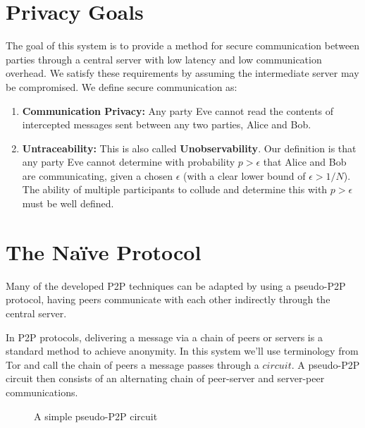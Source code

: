 \documentclass[twocolumn,11pt,english]{article}
\begin{document}
\section{Privacy Goals}
The goal of this system is to provide a method for secure communication between parties through a central server with low latency and low communication overhead. We satisfy these requirements by assuming the intermediate server may be compromised. We define secure communication as:
\begin{enumerate}
\item\textbf{Communication Privacy:} Any party Eve cannot read the contents of intercepted messages sent between any two parties, Alice and Bob. 
\item\textbf{Untraceability:} This is also called \textbf{Unobservability}. Our definition is that any party Eve cannot determine with probability $p > \epsilon$ that Alice and Bob are communicating, given a chosen $\epsilon$ (with a clear lower bound of $\epsilon > 1/N$). The ability of multiple participants to collude and determine this with $p > \epsilon$ must be well defined.
\end{enumerate}
\section{The Na\"ive Protocol}
\label{sec:naive}
Many of the developed P2P techniques can be adapted by using a pseudo-P2P protocol, having peers communicate with each other indirectly through the central server. 

In P2P protocols, delivering a message via a chain of peers or servers is a standard method to achieve anonymity. In this system we'll use terminology from Tor\cite{tor-design} and call the chain of peers a message passes through a $circuit$. A pseudo-P2P circuit then consists of an alternating chain of peer-server and server-peer communications.

\begin{figure}[ht]
  \begin{center}
  \end{center}
  \caption{A simple pseudo-P2P circuit}
\end{figure}
\end{document}

